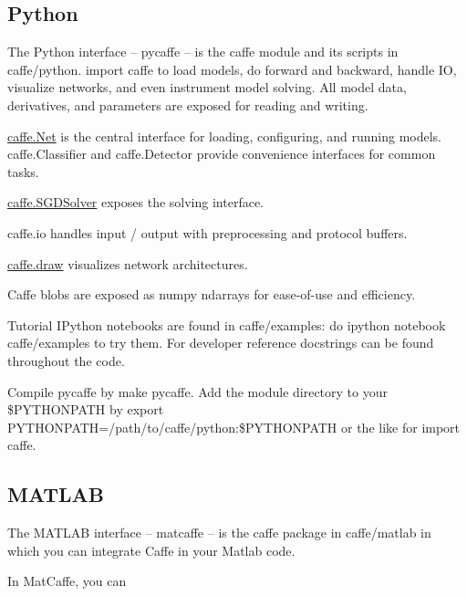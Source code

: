 \subsection*{Python}

The Python interface -- pycaffe -- is the {\ttfamily caffe} module and its scripts in caffe/python. {\ttfamily import caffe} to load models, do forward and backward, handle IO, visualize networks, and even instrument model solving. All model data, derivatives, and parameters are exposed for reading and writing.


\begin{DoxyItemize}
\item {\ttfamily \mbox{\hyperlink{classcaffe_1_1_net}{caffe.\+Net}}} is the central interface for loading, configuring, and running models. {\ttfamily caffe.\+Classifier} and {\ttfamily caffe.\+Detector} provide convenience interfaces for common tasks.
\item {\ttfamily \mbox{\hyperlink{classcaffe_1_1_s_g_d_solver}{caffe.\+S\+G\+D\+Solver}}} exposes the solving interface.
\item {\ttfamily caffe.\+io} handles input / output with preprocessing and protocol buffers.
\item {\ttfamily \mbox{\hyperlink{namespacecaffe_1_1draw}{caffe.\+draw}}} visualizes network architectures.
\item Caffe blobs are exposed as numpy ndarrays for ease-\/of-\/use and efficiency.
\end{DoxyItemize}

Tutorial I\+Python notebooks are found in caffe/examples\+: do {\ttfamily ipython notebook caffe/examples} to try them. For developer reference docstrings can be found throughout the code.

Compile pycaffe by {\ttfamily make pycaffe}. Add the module directory to your {\ttfamily \$\+P\+Y\+T\+H\+O\+N\+P\+A\+TH} by {\ttfamily export P\+Y\+T\+H\+O\+N\+P\+A\+TH=/path/to/caffe/python\+:\$\+P\+Y\+T\+H\+O\+N\+P\+A\+TH} or the like for {\ttfamily import caffe}.

\subsection*{M\+A\+T\+L\+AB}

The M\+A\+T\+L\+AB interface -- matcaffe -- is the {\ttfamily caffe} package in caffe/matlab in which you can integrate Caffe in your Matlab code.

In Mat\+Caffe, you can



